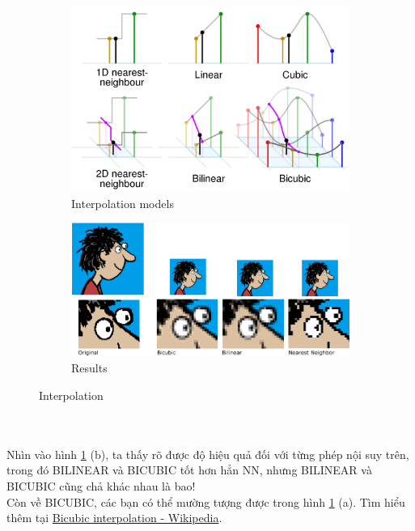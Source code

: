 \documentclass{article}
\begin{document}
\begin{figure}[ht!]
    \centering
    \begin{subfigure}[b]{0.7\linewidth}
        \includegraphics[width = \linewidth]{fig13.png}
        \caption{Interpolation models}
    \end{subfigure}
    \begin{subfigure}[b]{0.8\linewidth}
        \includegraphics[width = \linewidth]{fig14.png}
        \caption{Results}
    \end{subfigure}
    \caption{Interpolation}
    \label{fig13.5}
\end{figure} \phantom{a}\\\\
Nhìn vào hình \ref{fig13.5} (b), ta thấy rõ được độ hiệu quả đối với từng phép nội suy trên, trong đó BILINEAR và BICUBIC tốt hơn hẳn NN, nhưng BILINEAR và BICUBIC cũng chả khác nhau là bao!\\
Còn về BICUBIC, các bạn có thể mường tượng được trong hình \ref{fig13.5} (a). Tìm hiểu thêm tại \href{https://en.wikipedia.org/wiki/Bicubic_interpolation}{Bicubic interpolation - Wikipedia}.
\end{document}
